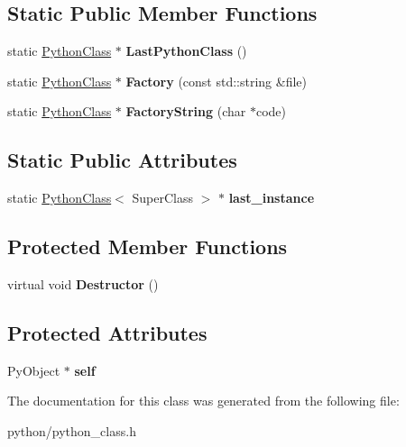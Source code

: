 \subsection*{Static Public Member Functions}
\begin{DoxyCompactItemize}
\item 
static \hyperlink{classPythonClass}{Python\+Class} $\ast$ {\bfseries Last\+Python\+Class} ()\hypertarget{classPythonClass_adfecbd2e7678ec3f914bf8455c0d58b8}{}\label{classPythonClass_adfecbd2e7678ec3f914bf8455c0d58b8}

\item 
static \hyperlink{classPythonClass}{Python\+Class} $\ast$ {\bfseries Factory} (const std\+::string \&file)\hypertarget{classPythonClass_abca292eba6c6a93b47a6926f1c632e23}{}\label{classPythonClass_abca292eba6c6a93b47a6926f1c632e23}

\item 
static \hyperlink{classPythonClass}{Python\+Class} $\ast$ {\bfseries Factory\+String} (char $\ast$code)\hypertarget{classPythonClass_a11ec0789d9b0ca259f5243600563a787}{}\label{classPythonClass_a11ec0789d9b0ca259f5243600563a787}

\end{DoxyCompactItemize}
\subsection*{Static Public Attributes}
\begin{DoxyCompactItemize}
\item 
static \hyperlink{classPythonClass}{Python\+Class}$<$ Super\+Class $>$ $\ast$ {\bfseries last\+\_\+instance}\hypertarget{classPythonClass_a4ddf15ccc5875b234b1c6acb2a8e65d5}{}\label{classPythonClass_a4ddf15ccc5875b234b1c6acb2a8e65d5}

\end{DoxyCompactItemize}
\subsection*{Protected Member Functions}
\begin{DoxyCompactItemize}
\item 
virtual void {\bfseries Destructor} ()\hypertarget{classPythonClass_aef6b7d1ea55588f1f8006e9100018e66}{}\label{classPythonClass_aef6b7d1ea55588f1f8006e9100018e66}

\end{DoxyCompactItemize}
\subsection*{Protected Attributes}
\begin{DoxyCompactItemize}
\item 
Py\+Object $\ast$ {\bfseries self}\hypertarget{classPythonClass_a9ea8cd2584c7d88effad3604c613b5e5}{}\label{classPythonClass_a9ea8cd2584c7d88effad3604c613b5e5}

\end{DoxyCompactItemize}


The documentation for this class was generated from the following file\+:\begin{DoxyCompactItemize}
\item 
python/python\+\_\+class.\+h\end{DoxyCompactItemize}
